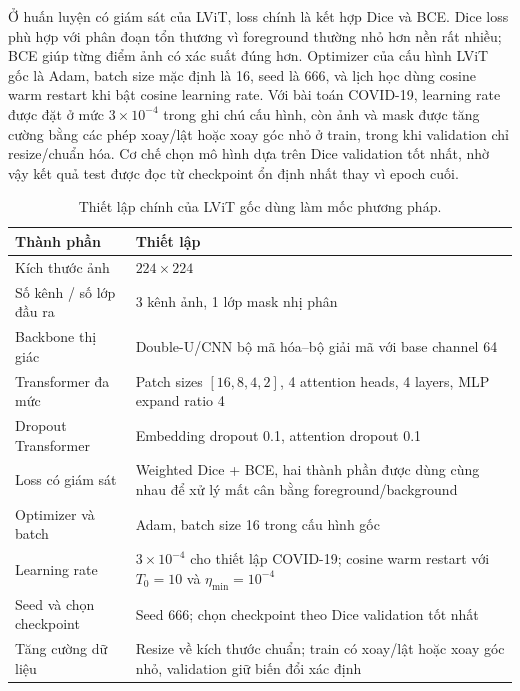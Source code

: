 Ở huấn luyện có giám sát của LViT, loss chính là kết hợp Dice và BCE. Dice loss phù hợp với phân đoạn tổn thương vì foreground thường nhỏ hơn nền rất nhiều; BCE giúp từng điểm ảnh có xác suất đúng hơn. Optimizer của cấu hình LViT gốc là Adam, batch size mặc định là 16, seed là 666, và lịch học dùng cosine warm restart khi bật cosine learning rate. Với bài toán COVID-19, learning rate được đặt ở mức \(3\times10^{-4}\) trong ghi chú cấu hình, còn ảnh và mask được tăng cường bằng các phép xoay/lật hoặc xoay góc nhỏ ở train, trong khi validation chỉ resize/chuẩn hóa. Cơ chế chọn mô hình dựa trên Dice validation tốt nhất, nhờ vậy kết quả test được đọc từ checkpoint ổn định nhất thay vì epoch cuối.

\begin{table}[H]
  \centering
  \caption{Thiết lập chính của LViT gốc dùng làm mốc phương pháp.}
  \label{tab:lvit-original-training-setup}
  \small
  \renewcommand{\arraystretch}{1.15}
  \setlength{\tabcolsep}{4pt}
  \begin{tabularx}{\textwidth}{@{}p{} Y@{}}
    \toprule
    Thành phần & Thiết lập \\
    \midrule
    Kích thước ảnh & \(224\times224\) \\
    Số kênh / số lớp đầu ra & 3 kênh ảnh, 1 lớp mask nhị phân \\
    Backbone thị giác & Double-U/CNN bộ mã hóa--bộ giải mã với base channel 64 \\
    Transformer đa mức & Patch sizes \([16,8,4,2]\), 4 attention heads, 4 layers, MLP expand ratio 4 \\
    Dropout Transformer & Embedding dropout 0.1, attention dropout 0.1 \\
    Loss có giám sát & Weighted Dice + BCE, hai thành phần được dùng cùng nhau để xử lý mất cân bằng foreground/background \\
    Optimizer và batch & Adam, batch size 16 trong cấu hình gốc \\
    Learning rate & \(3\times10^{-4}\) cho thiết lập COVID-19; cosine warm restart với \(T_0=10\) và \(\eta_{\min}=10^{-4}\) \\
    Seed và chọn checkpoint & Seed 666; chọn checkpoint theo Dice validation tốt nhất \\
    Tăng cường dữ liệu & Resize về kích thước chuẩn; train có xoay/lật hoặc xoay góc nhỏ, validation giữ biến đổi xác định \\
    \bottomrule
  \end{tabularx}
\end{table}
\FloatBarrier

